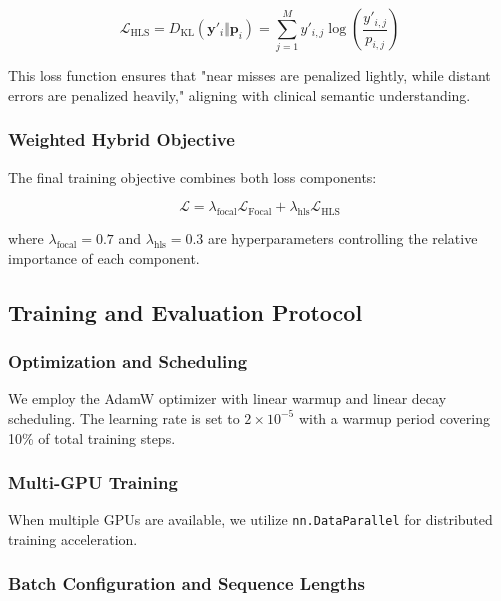 \documentclass{article}
\begin{document}
\begin{equation}
\mathcal{L}_{\text{HLS}} = D_{\text{KL}}(\mathbf{y}'_i \Vert \mathbf{p}_i) = \sum_{j=1}^{M} y'_{i,j} \log\left(\frac{y'_{i,j}}{p_{i,j}}\right)
\end{equation}

This loss function ensures that "near misses are penalized lightly, while distant errors are penalized heavily," aligning with clinical semantic understanding.

\subsubsection{Weighted Hybrid Objective}

The final training objective combines both loss components:

\begin{equation}
\mathcal{L} = \lambda_{\text{focal}} \mathcal{L}_{\text{Focal}} + \lambda_{\text{hls}} \mathcal{L}_{\text{HLS}}
\end{equation}

where $\lambda_{\text{focal}} = 0.7$ and $\lambda_{\text{hls}} = 0.3$ are hyperparameters controlling the relative importance of each component.

\subsection{Training and Evaluation Protocol}

\subsubsection{Optimization and Scheduling}

We employ the AdamW optimizer with linear warmup and linear decay scheduling. The learning rate is set to $2 \times 10^{-5}$ with a warmup period covering 10\% of total training steps.

\subsubsection{Multi-GPU Training}

When multiple GPUs are available, we utilize \texttt{nn.DataParallel} for distributed training acceleration.

\subsubsection{Batch Configuration and Sequence Lengths}
\end{document}
